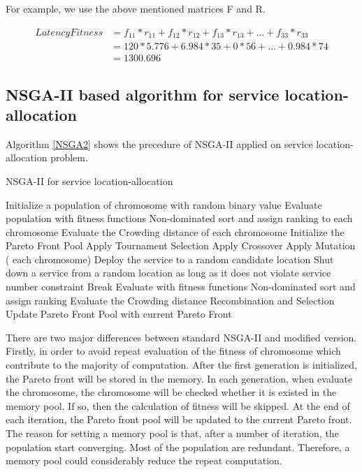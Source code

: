 \documentclass{llncs}
\begin{document}
\begin{flushleft}For example, we use the above mentioned matrices F and R.\end{flushleft}

\begin{align*}
	LatencyFitness &= f_{11} * r_{11} + f_{12} * r_{12} + f_{13} * r_{13} + ... + f_{33} * r_{33} \\
	&= 120 * 5.776 + 6.984 * 35 + 0 * 56 + ... + 0.984 * 74\\
	&= 1300.696
\end{align*}



\subsection{NSGA-II based algorithm for service location-allocation}
Algorithm \ref{NSGA2} shows the precedure of NSGA-II applied on service location-allocation problem.
\begin{algorithm}[htb]
	\caption{NSGA-II for service location-allocation}
	\label{NSGA2}
	\begin{algorithmic}[1]
		\State Initialize a population of chromosome with random binary value
		\State Evaluate population with fitness functions
		\State Non-dominated sort and assign ranking to each chromosome
		\State Evaluate the Crowding distance of each chromosome
		\State Initialize the Pareto Front Pool
		\State Apply Tournament Selection
		\State Apply Crossover 
		\State Apply Mutation
		\For( each chromosome)
		\State Deploy the service to a random candidate location
		\EndWhile
		\State Shut down a service from a random location as long as it does not violate service number constraint
		\State Break
		\EndIf
		\EndWhile
		\State Evaluate with fitness functions
		\EndIf
		\State Non-dominated sort and assign ranking
		\State Evaluate the Crowding distance
		\EndFor
		\State Recombination and Selection
		\State Update Pareto Front Pool with current Pareto Front
		\EndWhile
	\end{algorithmic}
\end{algorithm}

There are two major differences between standard NSGA-II and modified version. Firstly, in order to avoid repeat evaluation of the fitness
of chromosome which contribute to the majority of computation. After the first generation is initialized, the Pareto front will be 
stored in the memory. In each generation, when evaluate the chromosome, the chromosome will be checked whether it is existed in the memory pool. 
If so, then the calculation of fitness will be skipped. At the end of each iteration, the Pareto front pool will be updated to the current Pareto front.
The reason for setting a memory pool is that, after a number of iteration, the population start converging. 
Most of the population are redundant. Therefore, a memory pool could considerably reduce the repeat computation.
\end{document}
